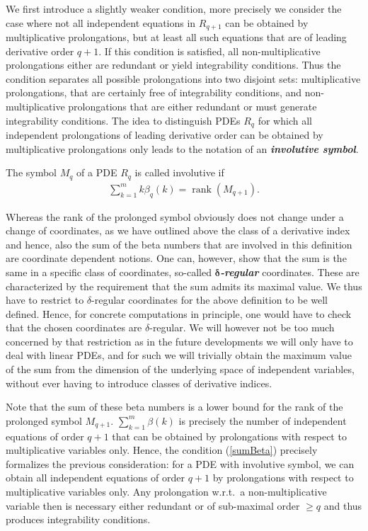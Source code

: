 We first introduce a slightly weaker condition, more precisely we consider the case where not all independent equations in $R_{q+1}$ can be obtained by multiplicative prolongations, but at least all such equations that are of leading derivative order $q+1$. If this condition is satisfied, all non-multiplicative prolongations either are redundant or yield integrability conditions.
Thus the condition separates all possible prolongations into two disjoint sets:  multiplicative prolongations, that are certainly free of integrability conditions, and non-multiplicative prolongations that are either redundant or must generate integrability conditions.
The idea to distinguish PDEs $R_q$ for which all independent prolongations of leading derivative order can be obtained by multiplicative prolongations only leads to the notation of an \textit{\textbf{involutive symbol}}. 
\begin{definition}
The symbol $M_q$ of a PDE $R_q$ is called involutive if
\begin{align}\label{sumBeta}
    \sum_{k=1}^m k\beta_q(k) = \operatorname{rank}(M_{q+1}).
\end{align}
\end{definition}
\begin{remark}
Whereas the rank of the prolonged symbol obviously does not change under a change of coordinates,
as we have outlined above the class of a derivative index and hence, also the sum of the beta numbers that are involved in this definition are coordinate dependent notions. One can, however, show that the sum is the same in a specific class of coordinates, so-called \textit{\textbf{$\boldsymbol{\delta}$-regular}} coordinates. These are characterized by the requirement that the sum admits its maximal value.
We thus have to restrict to $\delta$-regular coordinates for the above definition to be well defined.
Hence, for concrete computations in principle, one would have to check that the chosen coordinates are $\delta$-regular.  We will however not be too much concerned by that restriction as in the future developments we will only have to deal with linear PDEs, and for such we will trivially obtain the maximum value of the sum from the dimension of the underlying space of independent variables, without ever having to introduce classes of derivative indices.
\end{remark}
Note that the sum of these beta numbers is a lower bound for the rank of the prolonged symbol $M_{q+1}$. $\sum_{k=1}^m \beta(k)$ is precisely the number of independent equations of order $q+1$ that can be obtained by prolongations with respect to multiplicative variables only.  
Hence, the condition (\ref{sumBeta}) precisely formalizes the previous consideration: for a PDE with involutive symbol, we can obtain all independent equations of order $q+1$ by prolongations with respect to multiplicative variables only. Any prolongation w.r.t.\ a non-multiplicative variable then is necessary either redundant or of sub-maximal order $\geq q$ and thus produces integrability conditions.

